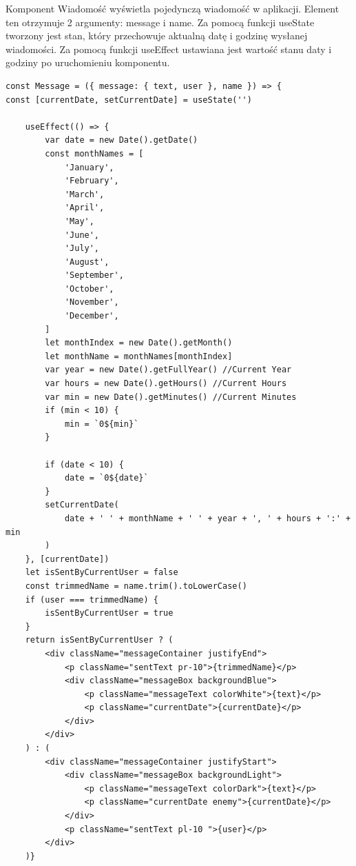 Komponent Wiadomość wyświetla pojedynczą wiadomość w aplikacji. Element ten otrzymuje 2 argumenty: message i name. Za pomocą funkcji useState tworzony jest stan, który przechowuje aktualną datę i godzinę wysłanej wiadomości. Za pomocą funkcji useEffect ustawiana jest wartość stanu daty i godziny po uruchomieniu komponentu. 
\begin{lstlisting}[caption=Implementacja komponentu z pojedynczą wiadomością ]
const Message = ({ message: { text, user }, name }) => {
const [currentDate, setCurrentDate] = useState('')

    useEffect(() => {
        var date = new Date().getDate() 
        const monthNames = [
            'January',
            'February',
            'March',
            'April',
            'May',
            'June',
            'July',
            'August',
            'September',
            'October',
            'November',
            'December',
        ]
        let monthIndex = new Date().getMonth()
        let monthName = monthNames[monthIndex]
        var year = new Date().getFullYear() //Current Year
        var hours = new Date().getHours() //Current Hours
        var min = new Date().getMinutes() //Current Minutes
        if (min < 10) {
            min = `0${min}`
        }

        if (date < 10) {
            date = `0${date}`
        }
        setCurrentDate(
            date + ' ' + monthName + ' ' + year + ', ' + hours + ':' + min
        )
    }, [currentDate])
    let isSentByCurrentUser = false
    const trimmedName = name.trim().toLowerCase()
    if (user === trimmedName) {
        isSentByCurrentUser = true
    }
    return isSentByCurrentUser ? (
        <div className="messageContainer justifyEnd">
            <p className="sentText pr-10">{trimmedName}</p>
            <div className="messageBox backgroundBlue">
                <p className="messageText colorWhite">{text}</p>
                <p className="currentDate">{currentDate}</p>
            </div>
        </div>
    ) : (
        <div className="messageContainer justifyStart">
            <div className="messageBox backgroundLight">
                <p className="messageText colorDark">{text}</p>
                <p className="currentDate enemy">{currentDate}</p>
            </div>
            <p className="sentText pl-10 ">{user}</p>
        </div>
    )}
\end{lstlisting}

